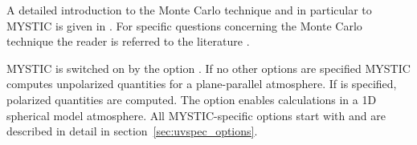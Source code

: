 A detailed introduction to the Monte Carlo technique and in particular
to MYSTIC is given in \citet{mayer2009}. For specific questions 
concerning the Monte Carlo technique the reader is referred to the literature  
\citep{marchuk1980,collins1972,marshak2005,cahalan2005}.

MYSTIC is switched on by the option . If no
other options are specified MYSTIC computes unpolarized quantities for
a  plane-parallel
atmosphere. If  is specified, polarized
quantities are computed. The option  enables
calculations in a 1D spherical model atmosphere. All MYSTIC-specific
options start with  and
are described in detail in section~\ref{sec:uvspec_options}.

